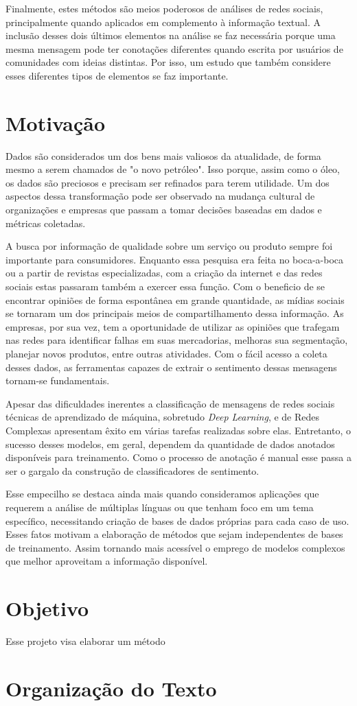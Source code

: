 Finalmente, estes métodos são meios poderosos de análises de redes sociais,
principalmente quando aplicados em complemento à informação textual.
A inclusão desses dois últimos elementos na análise se faz necessária porque uma
mesma mensagem pode ter conotações diferentes quando escrita por usuários de
comunidades com ideias distintas.
Por isso, um estudo que também considere esses diferentes tipos de elementos se
faz importante.

\section{Motivação}

Dados são considerados um dos bens mais valiosos da atualidade, de forma mesmo a
serem chamados de "o novo petróleo".
Isso porque, assim como o óleo, os dados são preciosos e precisam ser refinados
para terem utilidade.
Um dos aspectos dessa transformação pode ser observado na mudança cultural de
organizações e empresas que passam a tomar decisões baseadas em dados e métricas
coletadas.

A busca por informação de qualidade sobre um serviço ou produto sempre foi
importante para consumidores.
Enquanto essa pesquisa era feita no boca-a-boca ou a partir de revistas
especializadas, com a criação da internet e das redes sociais estas passaram
também a exercer essa função.
Com o beneficio de se encontrar opiniões de forma espontânea em grande quantidade,
as mídias sociais se tornaram um dos principais meios de compartilhamento dessa
informação.
As empresas, por sua vez, tem a oportunidade de utilizar as opiniões que
trafegam nas redes para identificar falhas em suas mercadorias, melhoras sua
segmentação, planejar novos produtos, entre outras atividades.
Com o fácil acesso a coleta desses dados, as ferramentas capazes de extrair o
sentimento dessas mensagens tornam-se fundamentais.

Apesar das dificuldades inerentes a classificação de mensagens de redes sociais
técnicas de aprendizado de máquina, sobretudo \textit{Deep Learning}, e de Redes
Complexas apresentam êxito em várias tarefas realizadas sobre elas.
Entretanto, o sucesso desses modelos, em geral, dependem da quantidade de dados
anotados disponíveis para treinamento.
Como o processo de anotação é manual esse passa a ser o gargalo da construção de
classificadores de sentimento.

Esse empecilho se destaca ainda mais quando consideramos aplicações que
requerem a análise de múltiplas línguas ou que tenham foco em um tema
específico, necessitando criação de bases de dados próprias para cada caso de
uso.
Esses fatos motivam a elaboração de métodos que sejam independentes de bases de
treinamento.
Assim tornando mais acessível o emprego de modelos complexos que melhor
aproveitam a informação disponível.

\section{Objetivo}

Esse projeto visa elaborar um método

\section{Organização do Texto}
